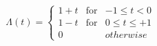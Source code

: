 \documentclass[preview]{standalone}
\begin{document}
\begin{align*}
\Lambda(t)=\left\{\begin{array}{rcl}1+t & \textrm{for} & -1\leq t<0 \\ 1-t & \textrm{for} & 0\leq t \leq +1 \\ 0 & & otherwise \end{array}\right.
\end{align*}
\end{document}
